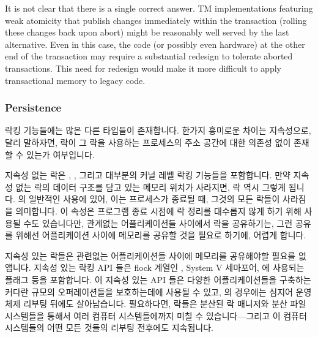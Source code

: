 It is not clear that there is a single correct answer.
TM implementations featuring weak atomicity that publish changes
immediately within the transaction (rolling these changes back upon abort)
might be reasonably well served by the last alternative.
Even in this case, the code (or possibly even hardware) at the other
end of the transaction may require a substantial redesign to tolerate
aborted transactions.
This need for redesign would make it more difficult to apply transactional
memory to legacy code.
\fi

\subsubsection{Persistence}
\label{sec:future:Persistence}

락킹 기능들에는 많은 다른 타입들이 존재합니다.
한가지 흥미로운 차이는 지속성으로, 달리 말하자면, 락이 그 락을 사용하는
프로세스의 주소 공간에 대한 의존성 없이 존재할 수 있는가 여부입니다.

지속성 없는 락은 , ,
그리고 대부분의 커널 레벨 락킹 기능들을 포함합니다.
만약 지속성 없는 락의 데이터 구조를 담고 있는 메모리 위치가 사라지면, 락 역시
그렇게 됩니다.
 의 일반적인 사용에 있어, 이는 프로세스가 종료될 때,
그것의 모든 락들이 사라짐을 의미합니다.
이 속성은 프로그램 종료 시점에 락 정리를 대수롭지 않게 하기 위해 사용될 수도
있습니다만, 관계없는 어플리케이션들 사이에서 락을 공유하기는, 그런 공유를
위해선 어플리케이션 사이에 메모리를 공유할 것을 필요로 하기에, 어렵게 합니다.

지속성 있는 락들은 관련없는 어플리케이션들 사이에 메모리를 공유해야할 필요를
없앱니다.
지속성 있는 락킹 API 들은 flock 계열인 , System V 세마포어,
 에 사용되는  플래그 등을 포함합니다.
이 지속성 있는 API 들은 다양한 어플리케이션들을 구축하는 커다란 규모의
오퍼레이션들을 보호하는데에 사용될 수 있고,  의 경우에는 심지어
운영체제 리부팅 뒤에도 살아남습니다.
필요하다면, 락들은 분산된 락 매니저와 분산 파일 시스템들을 통해서 여러 컴퓨터
시스템들에까지 미칠 수 있습니다---그리고 이 컴퓨터 시스템들의 어떤 모든 것들의
리부팅 전후에도 지속됩니다.

